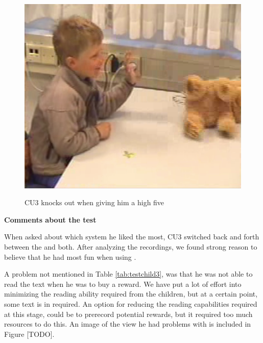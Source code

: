 \begin{figure}
\begin{minipage}[t]{0.3\linewidth}
		\label{fig:child-knockout2}
	\end{minipage}
	\hspace{0.5cm}
	\begin{minipage}[t]{0.3\linewidth}
		\centering
			\includegraphics[width=0.20\paperwidth]{Pictures/usability-pictures/knockout3.png}
		\label{fig:child-knockout3}
	\end{minipage}
	\label{fig:child-knockout}
	\caption{CU3 knocks out \ab{} when giving him a high five}
\end{figure}

\textbf{Comments about the test}

When asked about which system he liked the most, CU3 switched back and forth between the \app{} and both. After analyzing the recordings, we found strong reason to believe that he had most fun when using \app{}. 

A problem not mentioned in Table \ref{tab:testchild3}, was that he was not able to read the text when he was to buy a reward. We have put a lot of effort into minimizing the reading ability required from the children, but at a certain point, some text is in required. An option for reducing the reading capabilities required at this stage, could be to prerecord potential rewards, but  it required too much resources to do this. An image of the view he had problems with is included in Figure [TODO].   
 